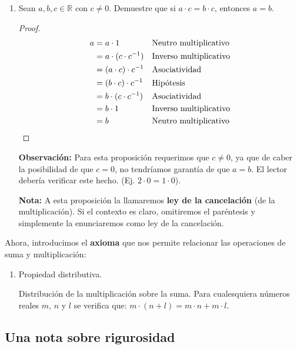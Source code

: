 \documentclass[11pt]{article}
\newcommand{\R}{\mathbb{R}}
\begin{document}
\begin{enumerate}[label=\alph*)]
    \item Sean $a,b,c\in \R$ con $c\neq 0$. Demuestre que si $a\cdot c=b\cdot c$, entonces $a=b$.
    \vspace{-1em}\begin{proof} 
        \begin{align*}
            a &= a\cdot 1 && \text{Neutro multiplicativo}\\
            &= a \cdot (c\cdot c^{-1}) && \text{Inverso multiplicativo}\\
            &= (a \cdot c) \cdot c^{-1} && \text{Asociatividad}\\
            &= (b \cdot c) \cdot c^{-1} && \text{Hipótesis}\\
            &= b \cdot (c\cdot c^{-1}) && \text{Asociatividad}\\
            &= b \cdot 1 && \text{Inverso multiplicativo}\\
            &= b && \text{Neutro multiplicativo}\qedhere
            \end{align*}    
    \end{proof} \vspace{-1em}
    \textbf{Observación:} Para esta proposición requerimos que $c\neq 0$, ya que de caber la posibilidad de que $c=0$, no tendríamos garantía de que $a=b$. El lector debería verificar este hecho. (Ej. $2\cdot 0 = 1 \cdot 0$).

    \textbf{Nota:} A esta proposición la llamaremos \textbf{ley de la cancelación} (de la multiplicación). Si el contexto es claro, omitiremos el paréntesis y simplemente la enunciaremos como ley de la cancelación.
    \end{enumerate}

    Ahora, introducimos el \textbf{axioma} que nos permite relacionar las operaciones de suma y multiplicación:

\begin{enumerate}[label=P.D.]
    \item Propiedad distributiva.
    
    Distribución de la multiplicación sobre la suma. Para cualesquiera números reales $m$, $n$ y $l$ se verifica que: $ m \cdot (n+l)=m \cdot n+m \cdot l $.
\end{enumerate}

\pagebreak

\subsection*{Una nota sobre rigurosidad}
\end{document}
